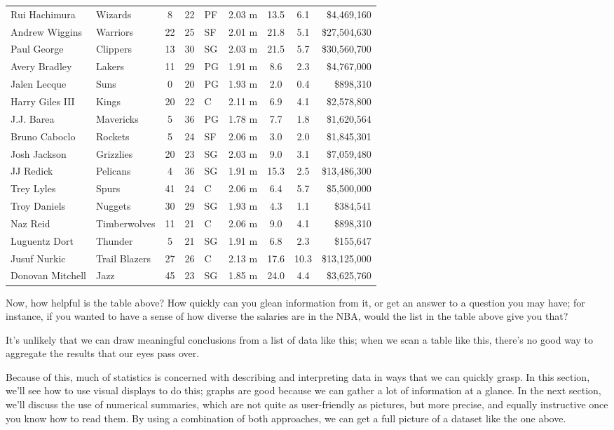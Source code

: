 \begin{center}
{\begin{tabular}{l l c c l c c c r}
Rui Hachimura & Wizards & 8 & 22 & PF & 2.03 m & 13.5 & 6.1 & \$4,469,160\\
Andrew Wiggins & Warriors & 22 & 25 & SF & 2.01 m & 21.8 & 5.1 & \$27,504,630\\
Paul George & Clippers & 13 & 30 & SG & 2.03 m & 21.5 & 5.7 & \$30,560,700\\
Avery Bradley & Lakers & 11 & 29 & PG & 1.91 m & 8.6 & 2.3 & \$4,767,000\\
Jalen Lecque & Suns & 0 & 20 & PG & 1.93 m & 2.0 & 0.4 & \$898,310\\
Harry Giles III & Kings & 20 & 22 & C & 2.11 m & 6.9 & 4.1 & \$2,578,800\\
J.J. Barea & Mavericks & 5 & 36 & PG & 1.78 m & 7.7 & 1.8 & \$1,620,564\\
Bruno Caboclo & Rockets & 5 & 24 & SF & 2.06 m & 3.0 & 2.0 & \$1,845,301\\
Josh Jackson & Grizzlies & 20 & 23 & SG & 2.03 m & 9.0 & 3.1 & \$7,059,480\\
JJ Redick & Pelicans & 4 & 36 & SG & 1.91 m & 15.3 & 2.5 & \$13,486,300\\
Trey Lyles & Spurs & 41 & 24 & C & 2.06 m & 6.4 & 5.7 & \$5,500,000\\
Troy Daniels & Nuggets & 30 & 29 & SG & 1.93 m & 4.3 & 1.1 & \$384,541\\
Naz Reid & Timberwolves & 11 & 21 & C & 2.06 m & 9.0 & 4.1 & \$898,310\\
Luguentz Dort & Thunder & 5 & 21 & SG & 1.91 m & 6.8 & 2.3 & \$155,647\\
Jusuf Nurkic & Trail Blazers & 27 & 26 & C & 2.13 m & 17.6 & 10.3 & \$13,125,000\\
Donovan Mitchell & Jazz & 45 & 23 & SG & 1.85 m & 24.0 & 4.4 & \$3,625,760
\end{tabular}}
\end{center}

Now, how helpful is the table above?  How quickly can you glean information from it, or get an answer to a question you may have; for instance, if you wanted to have a sense of how diverse the salaries are in the NBA, would the list in the table above give you that?

It's unlikely that we can draw meaningful conclusions from a list of data like this; when we scan a table like this, there's no good way to aggregate the results that our eyes pass over.
\pagebreak

Because of this, much of statistics is concerned with describing and interpreting data in ways that we can quickly grasp.  In this section, we'll see how to use visual displays to do this; graphs are good because we can gather a lot of information at a glance.  In the next section, we'll discuss the use of numerical summaries, which are not quite as user-friendly as pictures, but more precise, and equally instructive once you know how to read them.  By using a combination of both approaches, we can get a full picture of a dataset like the one above.

